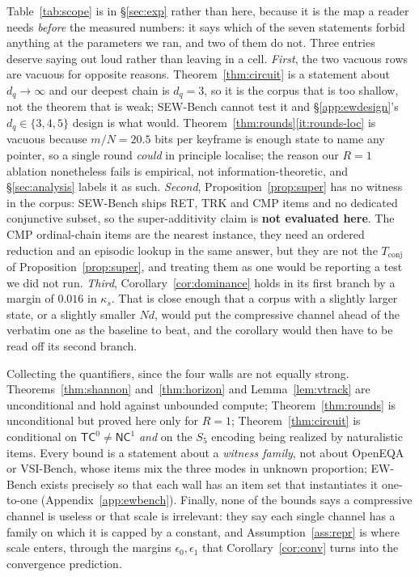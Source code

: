\documentclass[10pt]{article}
\theoremstyle{definition}
\theoremstyle{plain}
\begin{document}
Table~\ref{tab:scope} is in \S\ref{sec:exp} rather than here, because it is the map a
reader needs \emph{before} the measured numbers: it says which of the seven statements forbid
anything at the parameters we ran, and two of them do not. Three entries deserve saying out loud
rather than leaving in a cell.
\emph{First}, the two vacuous rows are vacuous for opposite reasons. Theorem~\ref{thm:circuit}
is a statement about $d_q\to\infty$ and our deepest chain is $d_q{=}3$, so it is the corpus that
is too shallow, not the theorem that is weak; SEW-Bench cannot test it and \S\ref{app:ewdesign}'s
$d_q\in\{3,4,5\}$ design is what would. Theorem~\ref{thm:rounds}\ref{it:rounds-loc} is vacuous
because $m/N=20.5$ bits per keyframe is enough state to name any pointer, so a single round
\emph{could} in principle localise; the reason our $R{=}1$ ablation nonetheless fails is
empirical, not information-theoretic, and \S\ref{sec:analysis} labels it as such.
\emph{Second}, Proposition~\ref{prop:super} has no witness in the corpus: SEW-Bench ships RET,
TRK and CMP items and no dedicated conjunctive subset, so the super-additivity claim is
\textbf{not evaluated here}. The CMP ordinal-chain items are the nearest instance, they need
an ordered reduction and an episodic lookup in the same answer, but they are not the
$T_{\mathrm{conj}}$ of Proposition~\ref{prop:super}, and treating them as one would be
reporting a test we did not run. \emph{Third}, Corollary~\ref{cor:dominance} holds in its
first branch by a margin of $0.016$ in $\kappa_s$. That is close enough that a corpus with a
slightly larger state, or a slightly smaller $Nd$, would put the compressive channel ahead of
the verbatim one as the baseline to beat, and the corollary would then have to be read off its
second branch.

Collecting the quantifiers, since the four walls are not equally strong. Theorems~\ref{thm:shannon} and~\ref{thm:horizon} and Lemma~\ref{lem:vtrack} are unconditional and hold against unbounded compute; Theorem~\ref{thm:rounds} is unconditional but proved here only for $R{=}1$; Theorem~\ref{thm:circuit} is conditional on $\mathsf{TC}^0\neq\mathsf{NC}^1$ \emph{and} on the $S_5$ encoding being realized by naturalistic items. Every bound is a statement about a \emph{witness family}, not about OpenEQA or VSI-Bench, whose items mix the three modes in unknown proportion; EW-Bench exists precisely so that each wall has an item set that instantiates it one-to-one (Appendix~\ref{app:ewbench}). Finally, none of the bounds says a compressive channel is useless or that scale is irrelevant: they say each single channel has a family on which it is capped by a constant, and Assumption~\ref{ass:repr} is where scale enters, through the margins $\epsilon_0,\epsilon_1$ that Corollary~\ref{cor:conv} turns into the convergence prediction.
\end{document}
